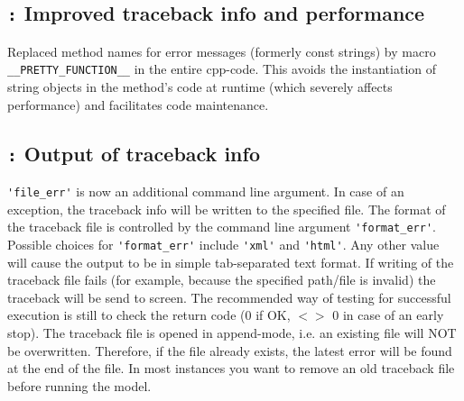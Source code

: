 \documentclass[a4paper,10pt]{article}
\newcommand{\logentry}[2]{\subsection*{\texttt{\color{red}{#1}:} \large{\textbf{#2}}}}
\begin{document}

\logentry{2011-08-04}{Improved traceback info and performance}
Replaced method names for error messages (formerly const strings) by macro \verb!__PRETTY_FUNCTION__! in the entire cpp-code. This avoids the instantiation of string objects in the method's code at runtime (which severely affects performance) and facilitates code maintenance.


\logentry{2011-08-01}{Output of traceback info}
\verb!'file_err'! is now an additional command line argument. In case of an exception, the traceback info will be written to the specified file. The format of the traceback file is controlled by the command line argument \verb!'format_err'!. Possible choices for \verb!'format_err'! include \verb!'xml'! and \verb!'html'!. Any other value will cause the output to be in simple tab-separated text format. If writing of the traceback file fails (for example, because the specified path/file is invalid) the traceback will be send to screen. The recommended way of testing for successful execution is still to check the return code (0 if OK, $<>$ 0 in case of an early stop).
The traceback file is opened in append-mode, i.e. an existing file will NOT be overwritten. Therefore, if the file already exists, the latest error will be found at the end of the file. In most instances you want to remove an old traceback file before running the model.
\end{document}

